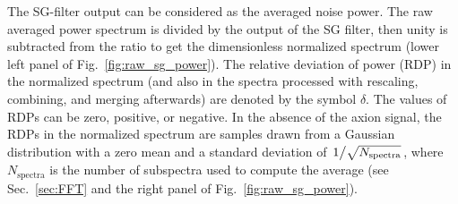 \documentclass[%
reprint, %
superscriptaddress,
 amsmath,amssymb,
 aps
]{revtex4-2}
\begin{document}
The SG-filter output can be considered as the averaged noise power. 
The raw averaged power spectrum is divided by the output of the SG filter, 
then unity is subtracted from the ratio to get the dimensionless 
normalized spectrum (lower left panel of Fig.~\ref{fig:raw_sg_power}). 
The relative deviation of power (RDP) in the normalized spectrum (and also in 
the spectra processed with rescaling, combining, and merging afterwards) are 
denoted by the symbol $\delta$. The values of 
RDPs can be zero, positive, or negative. 
In the absence of the axion signal, the RDPs in the normalized spectrum are 
samples drawn from a Gaussian 
distribution with a zero mean and a standard deviation of 
$\left.1\middle/\sqrt{N_\text{spectra}}\right.$, where $N_\text{spectra}$ is 
the number of subspectra used to compute the average (see Sec.~\ref{sec:FFT} 
and the right panel of Fig.~\ref{fig:raw_sg_power}). 
\end{document}

